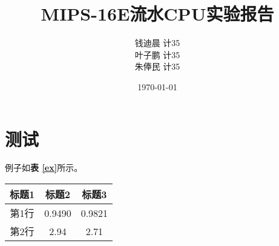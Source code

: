 \documentclass[11pt, a4paper]{article}
\title{\textbf{MIPS-16E流水CPU实验报告}}
\author{
    \kai 钱迪晨 \quad 计35 \quad 2013011402 \\
    \kai 叶子鹏 \quad 计35 \quad 2013011404 \\
    \kai 朱俸民 \quad 计35 \quad 2012011894
}
\date{\kai\today}
\makeatletter
\newcommand\fcaption{\def\@captype{figure}\caption}
\newcommand\tcaption{\def\@captype{table}\caption}
\newcommand{\tref}[1]{\textbf{表 \ref{#1}}}
\makeatother
\begin{document}
\maketitle

\section{测试}


例子如\tref{ex}所示。

\begin{center}
    \tcaption{三线表格例子}\label{ex}
    \begin{tabular}{ccc}
        \toprule
        标题1 & 标题2 & 标题3 \\
        \midrule
        第1行 & 0.9490 & 0.9821 \\
        第2行 & 2.94 & 2.71 \\
        \bottomrule
    \end{tabular}
\end{center}



\end{document}
